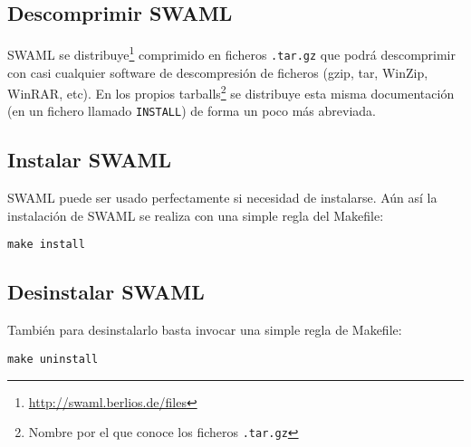 \subsection*{Descomprimir SWAML}

SWAML se distribuye\footnote{\url{http://swaml.berlios.de/files}} comprimido
en ficheros \texttt{.tar.gz}  que podrá descomprimir con casi cualquier 
software de descompresión de ficheros (gzip, tar, WinZip, WinRAR, etc). En 
los propios tarballs\footnote{Nombre por el que conoce los ficheros \texttt{.tar.gz}}
se distribuye esta misma documentación (en un fichero llamado \texttt{INSTALL})
de forma un poco más abreviada.

\subsection*{Instalar SWAML}

SWAML puede ser usado perfectamente si necesidad de instalarse. Aún así la instalación 
de SWAML se realiza con una simple regla del Makefile:

\begin{center}
	\texttt{make install}
\end{center}

\subsection*{Desinstalar SWAML}

También para desinstalarlo basta invocar una simple regla de Makefile:

\begin{center}
	\texttt{make uninstall}
\end{center}
